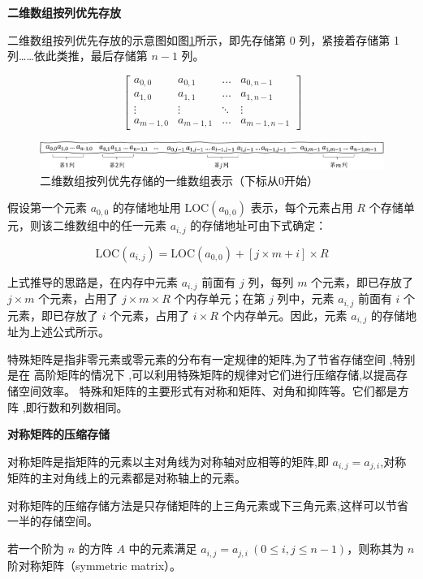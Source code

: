\documentclass[lang=cn,newtx,10pt,scheme=chinese]{elegantbook}
\begin{document}
\textbf{二维数组按列优先存放}

二维数组按列优先存放的示意图如图\ref{fig:column_major_array}所示，即先存储第 0 列，紧接着存储第 1 列……依此类推，最后存储第 $n-1$ 列。

\[
\begin{bmatrix}
a_{0,0} & a_{0,1} & \dots & a_{0,n-1} \\
a_{1,0} & a_{1,1} & \dots & a_{1,n-1} \\
\vdots & \vdots & \ddots & \vdots \\
a_{m-1,0} & a_{m-1,1} & \dots & a_{m-1,n-1}
\end{bmatrix}
\]

\begin{figure}[h]
  \centering
  \includegraphics[width=1\textwidth]{./figure/pdf/cropped/columnFirst.pdf}
  \caption{二维数组按列优先存储的一维数组表示（下标从0开始）}
  \label{fig:column_major_array}
\end{figure}

假设第一个元素 $a_{0,0}$ 的存储地址用 $\text{LOC}(a_{0,0})$ 表示，每个元素占用 $R$ 个存储单元，则该二维数组中的任一元素 $a_{i,j}$ 的存储地址可由下式确定：

\begin{equation}
\text{LOC}(a_{i,j}) = \text{LOC}(a_{0,0}) + [j \times m + i] \times R
\end{equation}

上式推导的思路是，在内存中元素 $a_{i,j}$ 前面有 $j$ 列，每列 $m$ 个元素，即已存放了 $j \times m$ 个元素，占用了 $j \times m \times R$ 个内存单元；在第 $j$ 列中，元素 $a_{i,j}$ 前面有 $i$ 个元素，即已存放了 $i$ 个元素，占用了 $i \times R$ 个内存单元。因此，元素 $a_{i,j}$ 的存储地址为上述公式所示。

特殊矩阵是指非零元素或零元素的分布有一定规律的矩阵,为了节省存储空间 ,特别是在
高阶矩阵的情况下 ,可以利用特殊矩阵的规律对它们进行压缩存储,以提高存储空间效率。
特殊和矩阵的主要形式有对称和矩阵、对角和抑阵等。它们都是方阵 ,即行数和列数相同。

\textbf{对称矩阵的压缩存储}

对称矩阵是指矩阵的元素以主对角线为对称轴对应相等的矩阵,即 $a_{i,j} = a_{j,i}$,对称矩阵的主对角线上的元素都是对称轴上的元素。

对称矩阵的压缩存储方法是只存储矩阵的上三角元素或下三角元素,这样可以节省一半的存储空间。


若一个阶为 $n$ 的方阵 $A$ 中的元素满足 $a_{i,j} = a_{j,i} \ (0 \leq i, j \leq n-1)$，则称其为 $n$ 阶对称矩阵（symmetric matrix）。
\end{document}
